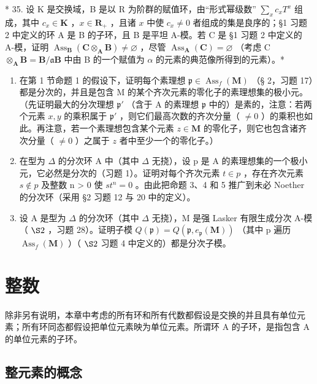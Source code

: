 * 35. 设 K 是交换域，B 是以 R 为阶群的赋值环，由``形式幂级数'' \(\sum_{x} c_{x} T^{x}\) 组成，其中 \(c_{x} \in \mathbf{K}\) ，\(x \in \mathbf{R}_{+}\) ，且诸 \(x\) 中使 \(c_{x} \neq 0\) 者组成的集是良序的；§1 习题 2 中定义的环 A 是 B 的子环，且 B 是平坦 A-模。若 C 是 §1 习题 2 中定义的 A-模，证明 \(\operatorname{Ass}_{\mathbf{B}}(\mathbf{C} \otimes_{\mathbf{A}} \mathbf{B}) \neq \varnothing\) ，尽管 \(\operatorname{Ass}_{\mathbf{A}}(\mathbf{C}) = \varnothing\) （考虑 C \(\otimes_{\mathbf{A}} \mathbf{B} = \mathbf{B}/\mathfrak{a}\mathbf{B}\) 中由 B 的一个赋值为 \(\alpha\) 的元素的典范像所得到的元素）。*


\begin{enumerate}
\def\labelenumi{\arabic{enumi}.}
\item
  在第 1 节命题 1 的假设下，证明每个素理想 \(\mathfrak{p} \in \operatorname{Ass}_f(\mathbf{M})\) （§ 2，习题 17）都是分次的，并且是包含 M 的某个齐次元素的零化子的素理想集的极小元。（先证明最大的分次理想 \(\mathfrak{p}'\) （含于 A 的素理想 \(\mathfrak{p}\) 中的）是素的，注意：若两个元素 \(x, y\) 的乘积属于 \(\mathfrak{p}'\) ，则它们最高次数的齐次分量（ \(\neq 0\) ）的乘积也如此。再注意，若一个素理想包含某个元素 \(z \in \mathbf{M}\) 的零化子，则它也包含诸齐次分量（ \(\neq 0\) ）之属于 \(z\) 者中至少一个的零化子。）
\item
  在型为 \(\Delta\) 的分次环 A 中（其中 \(\Delta\) 无挠），设 p 是 A 的素理想集的一个极小元，它必然是分次的（习题 1）。证明对每个齐次元素 \(t \in p\) ，存在齐次元素 \(s \notin p\) 及整数 n \textgreater{} 0 使 \(st^{n} = 0\) 。由此把命题 3、4 和 5 推广到未必 Noether 的分次环（采用 §2 习题 12 与 20 中的定义）。
\item
  设 A 是型为 \(\Delta\) 的分次环（其中 \(\Delta\) 无挠），M 是强 Lasker 有限生成分次 A-模（ \(\S 2\) ，习题 28）。证明子模 \(Q(\mathfrak{p}) = Q(\mathfrak{p}, e_{\mathfrak{p}}(\mathbf{M}))\) （其中 p 遍历 \(\operatorname{Ass}_{f}(\mathbf{M})\) ）（ \(\S 2\) 习题 4 中定义的）都是分次子模。
\end{enumerate}

\chapter{整数}

除非另有说明，本章中考虑的所有环和所有代数都假设是交换的并且具有单位元素；所有环同态都假设把单位元素映为单位元素。所谓环 A 的子环，是指包含 A 的单位元素的子环。

\section{整元素的概念}

